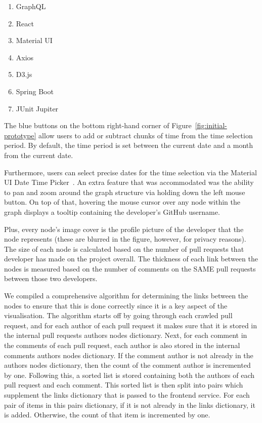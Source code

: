 \begin{enumerate}
    \item GraphQL
    \item React
    \item Material UI
    \item Axios
    \item D3.js
    \item Spring Boot
    \item JUnit Jupiter
\end{enumerate}


The blue buttons on the bottom right-hand corner of Figure~\ref{fig:initial-prototype} allow users
to add or subtract chunks of time from the time selection period.
By default, the time period is set between the current date and a month from the current date.


Furthermore,
users can select precise dates for the time selection via the Material UI Date Time Picker~\cite{MaterialUIDatePicker}.
An extra feature that was accommodated was the ability to pan and zoom around the graph structure
via holding down the left mouse button.
On top of that,
hovering the mouse cursor over any node within the graph displays a tooltip containing the developer's GitHub username.


Plus, every node's image cover is the profile picture of the developer that the node represents (these are blurred in the figure, however, for privacy reasons).
The size of each node is calculated based on the number of pull requests that developer has made on the project overall.
The thickness of each link between the nodes is measured based on the number of comments on the SAME pull requests between those two developers.


We compiled a comprehensive algorithm for determining the links between the nodes to ensure that this is done correctly since it is a key aspect of the visualisation.
The algorithm starts off by going through each crawled pull request, and for each author of each pull request it makes sure that it is stored in the internal pull requests authors nodes dictionary.
Next, for each comment in the comments of each pull request, each author is also stored in the internal comments authors nodes dictionary.
If the comment author is not already in the authors nodes dictionary, then the count of the comment author is incremented by one.
Following this, a sorted list is stored containing both the authors of each pull request and each comment.
This sorted list is then split into pairs which supplement the links dictionary that is passed to the frontend service.
For each pair of items in this pairs dictionary, if it is not already in the links dictionary, it is added.
Otherwise, the count of that item is incremented by one.